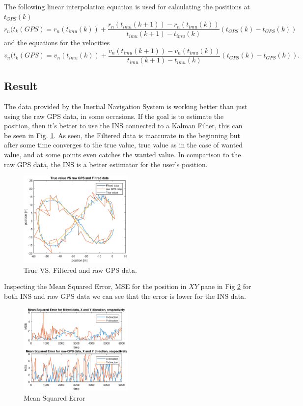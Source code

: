 The following linear interpolation equation is used for calculating the positions at $t_{GPS}(k)$
\begin{equation}
r_n(t_k(GPS) = r_n(t_{imu}(k)) + \frac{r_n(t_{imu}(k+1))-r_n(t_{imu}(k))}{t_{imu}(k+1)-t_{imu}(k)}(t_{GPS}(k)-t_{GPS}(k))
\end{equation}
 and the equations for the velocities 
 \begin{equation}
v_n(t_k(GPS) = v_n(t_{imu}(k)) + \frac{v_n(t_{imu}(k+1))-v_n(t_{imu}(k))}{t_{imu}(k+1)-t_{imu}(k)}(t_{GPS}(k)-t_{GPS}(k)).
\end{equation}
\subsection{Result}
The data provided by the Inertial Navigation System is working better than just using the raw GPS data, in some occasions. If the goal is to estimate the position, then it's better to use the INS connected to a Kalman Filter, this can be seen in Fig. \ref{Fig:result_kalman}. As seen, the Filtered data is inaccurate in the beginning but after some time converges to the true value, true value as in the case of wanted value, and at some points even catches the wanted value. In comparison to the raw GPS data, the INS is a better estimator for the user's position.
\begin{figure}[H]
\centering
\includegraphics[width=0.5\textwidth]{Figures/result.eps}
\caption{True VS. Filtered and raw GPS data.}
\label{Fig:result_kalman}
\end{figure}

Inspecting the Mean Squared Error, MSE for the position in $XY$ pane in Fig \ref{Fig:mse} for both INS and raw GPS data we can see that the error is lower for the INS data. 
\begin{figure}[H]
\centering
\includegraphics[width=0.5\textwidth]{Figures/mse.eps}
\caption{Mean Squared Error}
\label{Fig:mse}
\end{figure}

